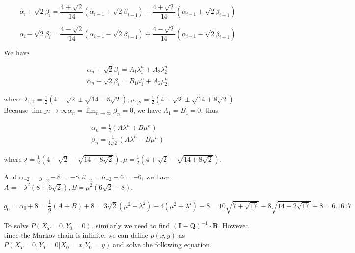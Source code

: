 \documentclass{article}
\begin{document}
\begin{equation}
    \alpha_i + \sqrt{2}\beta_i = \frac{4+\sqrt{2}}{14} (\alpha_{i-1} + \sqrt{2}\beta_{i-1}) + \frac{4+\sqrt{2}}{14} (\alpha_{i+1} + \sqrt{2}\beta_{i+1})
\end{equation}

\begin{equation}
    \alpha_i -\sqrt{2}\beta_i = \frac{4-\sqrt{2}}{14} (\alpha_{i-1} - \sqrt{2}\beta_{i-1}) + \frac{4-\sqrt{2}}{14} (\alpha_{i+1} -\sqrt{2}\beta_{i+1})
\end{equation}

We have 

\begin{equation}
    \begin{aligned}
        \alpha_n + \sqrt{2} \beta_i = A_1 \lambda_1 ^n + A_2 \lambda_2^n  \\
        \alpha_n - \sqrt{2} \beta_i = B_1 \mu_1 ^n + A_2 \mu_2^n 
    \end{aligned}
\end{equation}

where $\lambda_{1,2} = \frac{1}{2} (4-\sqrt{2}\pm \sqrt{14-8\sqrt{2}} ),\mu_{1,2} = \frac{1}{2} (4+\sqrt{2}\pm \sqrt{14+8\sqrt{2}} )$. Because $\lim\_{n\to \infty} \alpha_n = \lim_{n\to \infty}\beta_n = 0 $, we have $A_1 = B_1 = 0$, thus 

\begin{equation}
    \begin{aligned}
        \alpha_{n}  = \frac{1}{2} \left( A \lambda^n + B \mu^n \right) \\
        \beta_{n}  = \frac{1}{2\sqrt{2}} \left( A \lambda^n - B \mu^n \right)
    \end{aligned}
\end{equation}

where $\lambda = \frac{1}{2} (4-\sqrt{2}- \sqrt{14-8\sqrt{2}} ),\mu = \frac{1}{2} (4+\sqrt{2}-\sqrt{14+8\sqrt{2}} ).$

And $\alpha_{-2} = g_{-2} - 8 = -8,\beta_{-2} = h_{-2}-6 =  - 6 $, we have $A = -\lambda^2 (8+6\sqrt{2}),B =\mu^2(6\sqrt{2}-8)$.

\begin{equation}
    g_0 = \alpha_0 + 8 = \frac{1}{2}(A+B) + 8 = 3\sqrt{2} (\mu^2 - \lambda^2) - 4(\mu^2 + \lambda^2) + 8 =10 \sqrt{7+\sqrt{17}}-8 \sqrt{14-2 \sqrt{17}}-8 = 6.1617
\end{equation}

To solve $P(X_T=0,Y_T=0)$, similarly we need to find $ (\boldsymbol{I}-\boldsymbol{Q})^{-1}\cdot \boldsymbol{R}$. However, since the Markov chain is infinite, we can define $p(x,y)$ as $P(X_T=0,Y_T=0|X_0=x,Y_0 = y)$ and solve the following equation,
\end{document}

